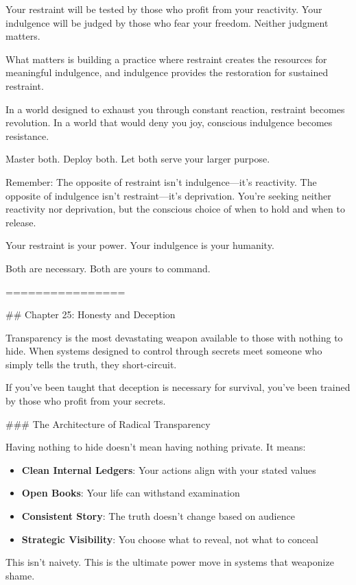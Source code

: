 \documentclass[12pt]{book}
\begin{document}
Your restraint will be tested by those who profit from your reactivity. Your indulgence will be judged by those who fear your freedom. Neither judgment matters.

What matters is building a practice where restraint creates the resources for meaningful indulgence, and indulgence provides the restoration for sustained restraint.

In a world designed to exhaust you through constant reaction, restraint becomes revolution. In a world that would deny you joy, conscious indulgence becomes resistance.

Master both. Deploy both. Let both serve your larger purpose.

Remember: The opposite of restraint isn't indulgence—it's reactivity. The opposite of indulgence isn't restraint—it's deprivation. You're seeking neither reactivity nor deprivation, but the conscious choice of when to hold and when to release.

Your restraint is your power. Your indulgence is your humanity.

Both are necessary. Both are yours to command.

================

\#\# Chapter 25: Honesty and Deception

Transparency is the most devastating weapon available to those with nothing to hide. When systems designed to control through secrets meet someone who simply tells the truth, they short-circuit. 

If you've been taught that deception is necessary for survival, you've been trained by those who profit from your secrets.

\#\#\# The Architecture of Radical Transparency

Having nothing to hide doesn't mean having nothing private. It means:

\begin{itemize}
\item \textbf{Clean Internal Ledgers}: Your actions align with your stated values
\item \textbf{Open Books}: Your life can withstand examination
\item \textbf{Consistent Story}: The truth doesn't change based on audience
\item \textbf{Strategic Visibility}: You choose what to reveal, not what to conceal

\end{itemize}
This isn't naivety. This is the ultimate power move in systems that weaponize shame.
\end{document}
